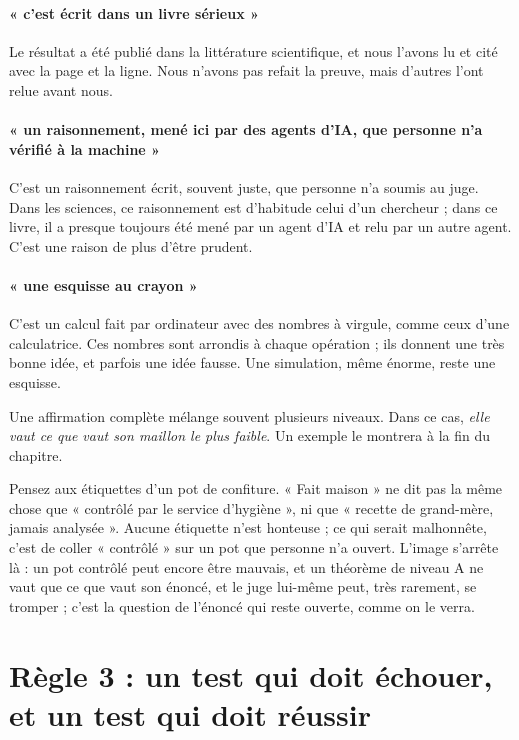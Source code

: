 \paragraph{ « c'est écrit dans un livre sérieux »} Le résultat a été publié dans la littérature
scientifique, et nous l'avons lu et cité avec la page et la ligne. Nous n'avons pas refait la preuve, mais d'autres
l'ont relue avant nous.

\paragraph{ « un raisonnement, mené ici par des agents d'IA, que personne n'a vérifié à la machine »}
C'est un raisonnement écrit, souvent juste, que personne n'a soumis au juge. Dans les sciences, ce raisonnement est
d'habitude celui d'un chercheur ; dans ce livre, il a presque toujours été mené par un agent d'IA et relu par un autre
agent. C'est une raison de plus d'être prudent.

\paragraph{ « une esquisse au crayon »} C'est un calcul fait par ordinateur avec des nombres à virgule, comme
ceux d'une calculatrice. Ces nombres sont arrondis à chaque opération ; ils donnent une très bonne idée, et parfois une
idée fausse. Une simulation, même énorme, reste une esquisse.

\medskip
Une affirmation complète mélange souvent plusieurs niveaux. Dans ce cas, \emph{elle vaut ce que vaut son maillon le
plus faible}. Un exemple le montrera à la fin du chapitre.

\begin{analogie}
Pensez aux étiquettes d'un pot de confiture. « Fait maison » ne dit pas la même chose que « contrôlé par le service
d'hygiène », ni que « recette de grand-mère, jamais analysée ». Aucune étiquette n'est honteuse ; ce qui serait
malhonnête, c'est de coller « contrôlé » sur un pot que personne n'a ouvert. L'image s'arrête là : un pot contrôlé
peut encore être mauvais, et un théorème de niveau A ne vaut que ce que vaut son énoncé, et le juge lui-même peut, très
rarement, se tromper ; c'est la question de l'énoncé qui reste ouverte, comme on le verra.
\end{analogie}

\section{Règle 3 : un test qui doit échouer, et un test qui doit réussir}

